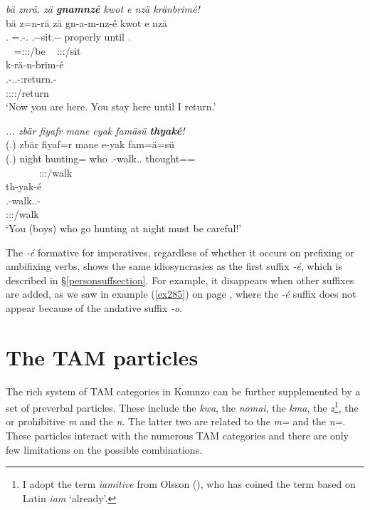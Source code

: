 \begin{exe}
	\ex \emph{bä znrä. zä \textbf{gnamnzé} kwot e nzä kränbrimé!}\\
	\glll bä z=n-rä zä gn-a-m-nz-é kwot e nzä\\
	\Second.{\Abs} \Prox=\Ssg.\Alph-\Cop.{\Ndu} {\Prox} \Ssg.\Bet-\Vc-sit.\Ext-\Ndu-{\Imp} properly until \Fsg.{\Abs}\\
	~ {\footnotesize \Prox=\Ssg:\Sbj:\Nonpast:\Ipfv/be} ~ {\footnotesize \Ssg:\Sbj:\Imp:\Ipfv/sit} ~ ~ ~\\
	\sn
	\glll k-rä-n-brim-é\\
	\M.\Bet-\Irr.\Vc.\Ndu-\Venit:return.\Rs-\Fsg{}\\
	{\footnotesize \Fsg:\Sbj:\Irr:\Pfv:\Venit/return}\\
	\trans `Now you are here. You stay here until I return.' 
	\label{ex301}
\end{exe}
\begin{exe}
	\ex \emph{... zbär fiyafr mane eyak famäsü \textbf{thyaké}!}\\
	\glll (.) zbär fiyaf=r mane e-yak fam=ä=sü\\
	(.) night hunting={\Purp} who \Stnsg.\Alph-walk.\Ext.{\Ndu} thought=\Assoc=\Etc{}\\
	~ ~ ~ ~ {\footnotesize \Stpl:\Sbj:\Nonpast:\Ipfv/walk} ~\\
	\sn
	\glll th-yak-é\\
	\Stnsg.\Bet-walk.\Ext.\Ndu-\Imp\\
	{\footnotesize \Stpl:\Sbj:\Imp:\Ipfv/walk}\\
	\trans `You (boys) who go hunting at night must be careful!' 
	\label{ex302}
\end{exe}

The \emph{-é} formative for imperatives, regardless of whether it occurs on prefixing or ambifixing verbs, shows the same idiosyncrasies as the first   suffix \emph{-é}, which is described in {\S}\ref{personsuffsection}. For example, it disappears when other suffixes are added, as we saw in example (\ref{ex285}) on page \pageref{ex285}, where the \emph{-é} suffix does not appear because of the andative suffix \emph{-o}.

\section{The TAM particles}\label{tam-particles-sec}

The rich system of TAM categories in Komnzo can be further supplemented by a set of preverbal particles. These include the  \emph{kwa}, the  \emph{nomai}, the  \emph{kma}, the  \emph{z}\footnote{I adopt the term \emph{iamitive} from Olsson (\citeyear{Olsson:2013vn}), who has coined the term based on Latin \emph{iam} `already'.}, the  or prohibitive \emph{m} and the  \emph{n}. The latter two are related to the   \emph{m=} and the  \emph{n=}. These particles interact with the numerous TAM categories and there are only few limitations on the possible combinations.

